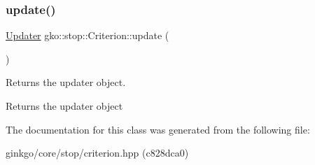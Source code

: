 \subsubsection{\texorpdfstring{update()}{update()}}
{\footnotesize\ttfamily \hyperlink{classgko_1_1stop_1_1Criterion_1_1Updater}{Updater} gko\+::stop\+::\+Criterion\+::update (\begin{DoxyParamCaption}{ }\end{DoxyParamCaption})}



Returns the updater object. 

\begin{DoxyReturn}{Returns}
the updater object 
\end{DoxyReturn}


The documentation for this class was generated from the following file\+:\begin{DoxyCompactItemize}
\item 
ginkgo/core/stop/criterion.\+hpp (c828dca0)\end{DoxyCompactItemize}
